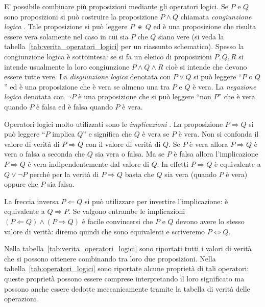 E' possibile combinare più proposizioni mediante
gli operatori logici. Se $P$ e $Q$ sono proposizioni
si può costruire la proposizione $P \land Q$
chiamata \emph{congiunzione logica}%
%
.
Tale proposizione
si può leggere \texttt{$P$ e $Q$} ed è una proposizione
che risulta essere vera solamente nel caso in cui sia
$P$ che $Q$ siano vere
(si veda la tabella~\ref{tab:verita_operatori_logici}
per un riassunto schematico).
Spesso la congiunzione logica è sottointesa:
se si fa un elenco di proposizioni $P,Q,R$ 
si intende usualmente la loro congiunzione $P \land Q \land R$
cioè si intende che devono essere tutte vere.
La \emph{disgiunzione logica}%
%
 denotata
con $P \lor Q$
si può leggere ``$P$ o $Q$'' ed è una proposizione che
è vera se almeno una tra $P$ e $Q$ è vera.
La \emph{negazione logica}%
%
 denotata con $\lnot P$ è una
proposizione che si può leggere ``non $P$'' che
è vera quando $P$ è falsa ed è falsa quando $P$ è vera.

Operatori logici molto utilizzati sono le \emph{implicazioni}%
%
.
La proposizione $P\Rightarrow Q$ si può leggere ``$P$ implica $Q$''
e significa che $Q$ è vera se $P$ è vera. Non si confonda
il valore di verità di $P\Rightarrow Q$ con il valore di verità
di $Q$. Se $P$ è vera allora $P\Rightarrow Q$ è vera o falsa
a seconda che $Q$ sia vera o falsa. Ma se $P$ è falsa allora
l'implicazione $P\Rightarrow Q$ è vera indipendentemente dal
valore di $Q$. In effetti $P\Rightarrow Q$ è equivalente a
$Q \lor \lnot P$ perché per la verità di $P\Rightarrow Q$
basta che $Q$ sia vera (quando $P$ è vera) oppure che $P$ sia falsa.

La freccia inversa $P\Leftarrow Q$ si può utilizzare per
invertire l'implicazione: è equivalente a $Q \Rightarrow P$.
Se valgono entrambe le implicazioni
$(P \Leftarrow Q) \land (P\Rightarrow Q)$
è facile convincersi che $P$ e $Q$ devono avere lo stesso
valore di verità: diremo quindi che sono equivalenti e
scriveremo $P \Leftrightarrow Q$.

Nella tabella~\ref{tab:verita_operatori_logici} sono riportati
tutti i valori di verità che si possono ottenere combinando
tra loro due proposizioni. Nella tabella~\ref{tab:operatori_logici}
sono riportate alcune proprietà di tali operatori: queste
proprietà possono essere comprese interpretando il loro significato
ma possono anche essere dedotte meccanicamente tramite la tabella
di verità delle operazioni.

